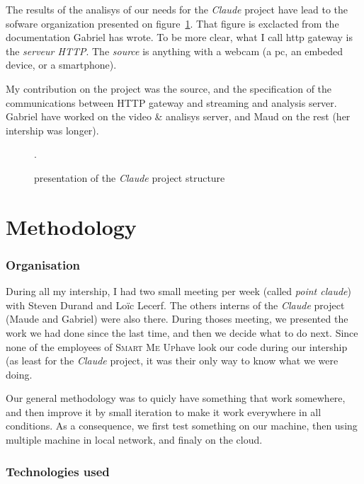 \documentclass[a4paper,11pt]{custom}
\newcommand{\smu}{\textsc{Smart Me Up}}
\newcommand{\claude}{\textit{Claude}}
\begin{document}
The results of the analisys of our needs for the \claude{} project have lead to
the sofware organization presented on figure~\ref{fig:architecture}. That figure
is exclacted from the documentation Gabriel has wrote. To be more clear, what I
call http gateway is the \textit{serveur HTTP}. The \textit{source} is anything
with a webcam (a pc, an embeded device, or a smartphone).

My contribution on the project was the source, and the specification of the
communications between HTTP gateway and streaming and analysis server. Gabriel
have worked on the video \& analisys server, and Maud on the rest (her intership
was longer).

\begin{figure}
  \centering
  \def\svgwidth{\columnwidth}
  
  \label{fig:architecture}
  \caption{presentation of the \claude{} project structure}.
\end{figure}

\chapter{Methodology}
\label{chap:Methodology}

\subsection{Organisation}

During all my intership, I had two small meeting per week (called \textit{point
claude}) with Steven Durand and Loïc Lecerf. The others interns of the \claude{}
project (Maude and Gabriel) were also there. During thoses meeting, we presented
the work we had done since the last time, and then we decide what to do next.
Since none of the employees of \smu have look our code during our intership (as
least for the \claude{} project, it was their only way to know what we were
doing.

Our general methodology was to quicly have something that work somewhere, and
then improve it by small iteration to make it work everywhere in all conditions.
As a consequence, we first test something on our machine, then using multiple
machine in local network, and finaly on the cloud.


\subsection{Technologies used}
\end{document}
